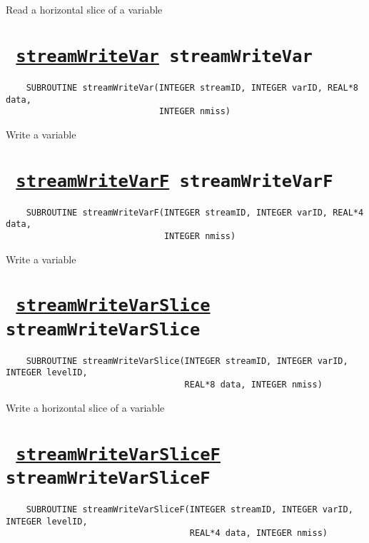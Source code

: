 Read a horizontal slice of a variable
\ifpdfoutput{}{(\ref{streamReadVarSliceF})}


\section*{\texttt{ 
\ifpdf
\hyperref[streamWriteVar]{streamWriteVar}
\else
streamWriteVar
\fi
}}
\begin{verbatim}
    SUBROUTINE streamWriteVar(INTEGER streamID, INTEGER varID, REAL*8 data, 
                              INTEGER nmiss)
\end{verbatim}

Write a variable
\ifpdfoutput{}{(\ref{streamWriteVar})}


\section*{\texttt{ 
\ifpdf
\hyperref[streamWriteVarF]{streamWriteVarF}
\else
streamWriteVarF
\fi
}}
\begin{verbatim}
    SUBROUTINE streamWriteVarF(INTEGER streamID, INTEGER varID, REAL*4 data, 
                               INTEGER nmiss)
\end{verbatim}

Write a variable
\ifpdfoutput{}{(\ref{streamWriteVarF})}


\section*{\texttt{ 
\ifpdf
\hyperref[streamWriteVarSlice]{streamWriteVarSlice}
\else
streamWriteVarSlice
\fi
}}
\begin{verbatim}
    SUBROUTINE streamWriteVarSlice(INTEGER streamID, INTEGER varID, INTEGER levelID, 
                                   REAL*8 data, INTEGER nmiss)
\end{verbatim}

Write a horizontal slice of a variable
\ifpdfoutput{}{(\ref{streamWriteVarSlice})}


\section*{\texttt{ 
\ifpdf
\hyperref[streamWriteVarSliceF]{streamWriteVarSliceF}
\else
streamWriteVarSliceF
\fi
}}
\begin{verbatim}
    SUBROUTINE streamWriteVarSliceF(INTEGER streamID, INTEGER varID, INTEGER levelID, 
                                    REAL*4 data, INTEGER nmiss)
\end{verbatim}

